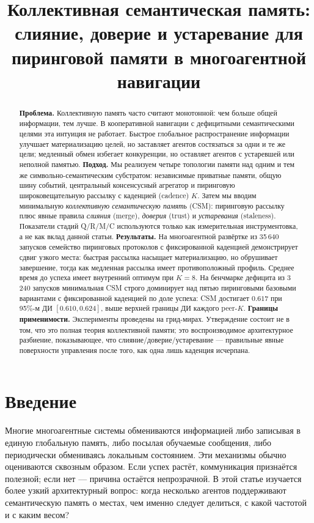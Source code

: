 \documentclass{article}
\title{Коллективная семантическая память: слияние, доверие и устаревание для пиринговой памяти в многоагентной навигации}
\begin{document}
\maketitle

\begin{abstract}
\textbf{Проблема.} Коллективную память часто считают монотонной: чем больше общей информации, тем лучше. В кооперативной навигации с дефицитными семантическими целями эта интуиция не работает. Быстрое глобальное распространение информации улучшает материализацию целей, но заставляет агентов состязаться за одни и те же цели; медленный обмен избегает конкуренции, но оставляет агентов с устаревшей или неполной памятью.
\textbf{Подход.} Мы реализуем четыре топологии памяти над одним и тем же символьно-семантическим субстратом: независимые приватные памяти, общую шину событий, центральный консенсусный агрегатор и пиринговую широковещательную рассылку с каденцией (cadence) $K$. Затем мы вводим минимальную \emph{коллективную семантическую память} (CSM): пиринговую рассылку плюс явные правила \emph{слияния} (merge), \emph{доверия} (trust) и \emph{устаревания} (staleness). Показатели стадий Q/R/M/C используются только как измерительная инструментовка, а не как вклад данной статьи.
\textbf{Результаты.} На многоагентной развёртке из 35\,640 запусков семейство пиринговых протоколов с фиксированной каденцией демонстрирует сдвиг узкого места: быстрая рассылка насыщает материализацию, но обрушивает завершение, тогда как медленная рассылка имеет противоположный профиль. Среднее время до успеха имеет внутренний оптимум при $K{=}8$. На бенчмарке дефицита из 3\,240 запусков минимальная CSM строго доминирует над пятью пиринговыми базовыми вариантами с фиксированной каденцией по доле успеха: CSM достигает $0.617$ при 95\%-м ДИ $[0.610,0.624]$, выше верхней границы ДИ каждого peer-$K$.
\textbf{Границы применимости.} Эксперименты проведены на грид-мирах. Утверждение состоит не в том, что это полная теория коллективной памяти; это воспроизводимое архитектурное разбиение, показывающее, что слияние/доверие/устаревание --- правильные явные поверхности управления после того, как одна лишь каденция исчерпана.
\end{abstract}

\section{Введение}

Многие многоагентные системы обмениваются информацией либо записывая
в единую глобальную память, либо посылая обучаемые сообщения, либо
периодически обмениваясь локальным состоянием. Эти механизмы обычно
оцениваются сквозным образом. Если успех растёт, коммуникация
признаётся полезной; если нет --- причина остаётся непрозрачной. В этой
статье изучается более узкий архитектурный вопрос: когда несколько
агентов поддерживают семантическую память о местах, чем именно следует
делиться, с какой частотой и с каким весом?
\end{document}

